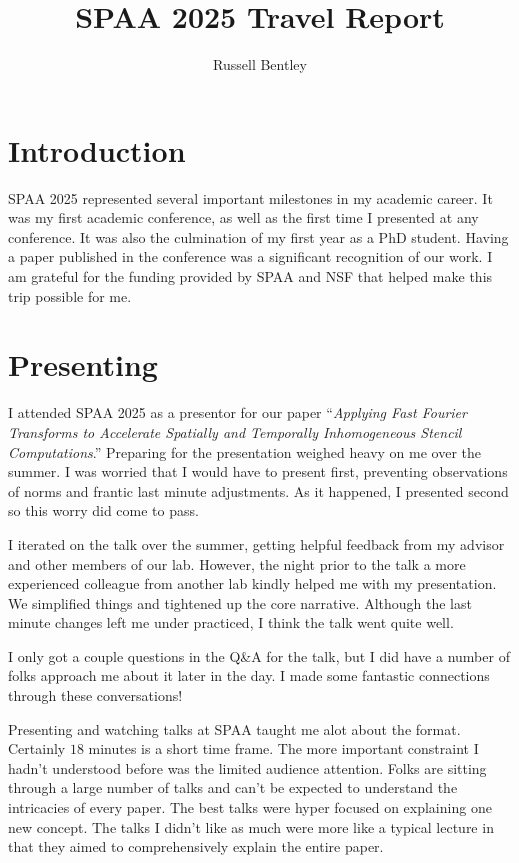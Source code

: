 \documentclass{article}
\title{SPAA 2025 Travel Report}
\author{Russell Bentley}
\begin{document}
\twocolumn

\maketitle
\section{Introduction}

SPAA 2025 represented several important milestones in my academic career.
It was my first academic conference,
as well as the first time I presented at any conference.
It was also the culmination of my first year as a PhD student.
Having a paper published in the conference was a significant 
recognition of our work. 
I am grateful for the funding provided by SPAA and NSF 
that helped make this trip possible for me.

\section{Presenting}

I attended SPAA 2025 as a presentor for our paper 
``\textit{Applying Fast Fourier Transforms to Accelerate Spatially and Temporally Inhomogeneous Stencil Computations}.''
Preparing for the presentation weighed heavy on me over the summer.
I was worried that I would have to present first, 
preventing observations of norms and frantic last minute adjustments.
As it happened, I presented second so this worry did come to pass.

I iterated on the talk over the summer,
getting helpful feedback from my advisor and other members of our lab.
However, the night prior to the talk a more experienced colleague 
from another lab kindly helped me with my presentation.
We simplified things and tightened up the core narrative.
Although the last minute changes left me under practiced, 
I think the talk went quite well.

I only got a couple questions in the Q\&A for the talk, 
but I did have a number of folks approach me about it later in the day.
I made some fantastic connections through these conversations!

Presenting and watching talks at SPAA taught me alot about the format.
Certainly $18$ minutes is a short time frame. 
The more important constraint I hadn't understood before was the limited audience attention.
Folks are sitting through a large number of talks 
and can't be expected to understand the intricacies of every paper.
The best talks were hyper focused on explaining one new concept.
The talks I didn't like as much were more like a typical lecture 
in that they aimed to comprehensively explain the entire paper.
\end{document}
